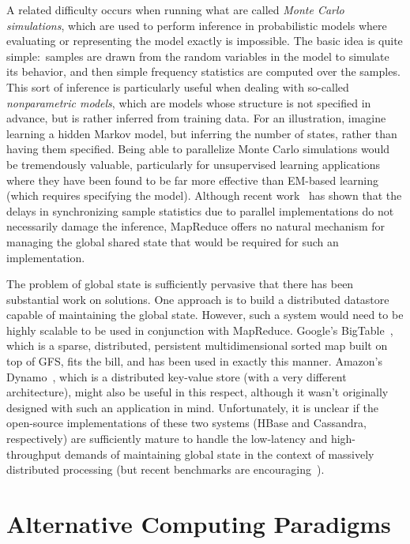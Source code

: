 A related difficulty occurs when running what are called \emph{Monte
  Carlo simulations}, which are used to perform inference in
probabilistic models where evaluating or representing the model
exactly is impossible.  The basic idea is quite simple:\ samples are
drawn from the random variables in the model to simulate its behavior,
and then simple frequency statistics are computed over the samples.
This sort of inference is particularly useful when dealing with
so-called \emph{nonparametric models}, which are models whose
structure is not specified in advance, but is rather inferred from
training data.  For an illustration, imagine learning a hidden Markov
model, but inferring the number of states, rather than having them
specified.  Being able to parallelize Monte Carlo simulations would be
tremendously valuable, particularly for unsupervised learning
applications where they have been found to be far more effective than
EM-based learning (which requires specifying the model).  Although
recent work~\cite{Asuncion_2008} has shown that the delays in
synchronizing sample statistics due to parallel implementations do not
necessarily damage the inference, MapReduce offers no natural
mechanism for managing the global shared state that would be required
for such an implementation.

The problem of global state is sufficiently pervasive that there has
been substantial work on solutions.  One approach is to build a
distributed datastore capable of maintaining the global state.
However, such a system would need to be highly scalable to be used in
conjunction with MapReduce.  Google's
BigTable~\cite{ChangFay_etal_OSDI2006}, which is a sparse,
distributed, persistent multidimensional sorted map built on top of
GFS, fits the bill, and has been used in exactly this manner.
Amazon's Dynamo~\cite{DeCandia_etal_2007}, which is a distributed
key-value store (with a very different architecture), might also be
useful in this respect, although it wasn't originally designed with
such an application in mind.  Unfortunately, it is unclear if the
open-source implementations of these two systems (HBase and Cassandra,
respectively) are sufficiently mature to handle the low-latency and
high-throughput demands of maintaining global state in the context of
massively distributed processing (but recent benchmarks are
encouraging~\cite{CooperBrian_etal_2010}).

\section{Alternative Computing Paradigms}
\label{chapter-conclusion:alternatives}

